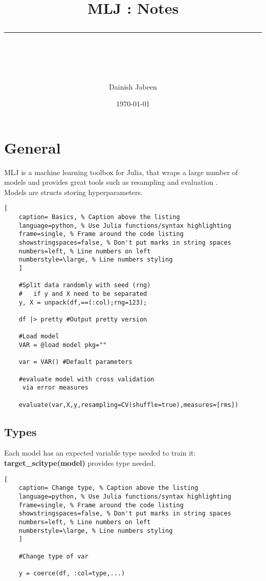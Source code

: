 \documentclass[11pt]{scrartcl} %
\title{	
	\normalfont\normalsize
	\vspace{20pt} %
	{\huge MLJ : Notes}\\ %
	\vspace{12pt} %
	\rule{\linewidth}{2pt}\\ %
}
\author{\small Dainish Jabeen} %
\date{\normalsize\today} %
\begin{document}
\maketitle %

\section{General}

MLJ is a machine learning toolbox for Julia, that wraps a large number of models and provides
great tools such as resampling and evaluation \cite{Blaom2020} \cite{blaom2020flexible}.\\

Models are structs storing hyperparameters.

\begin{lstlisting}[
	caption= Basics, % Caption above the listing
	language=python, % Use Julia functions/syntax highlighting
	frame=single, % Frame around the code listing
	showstringspaces=false, % Don't put marks in string spaces
	numbers=left, % Line numbers on left
	numberstyle=\large, % Line numbers styling
	]

	#Split data randomly with seed (rng) 
	#	if y and X need to be separated
	y, X = unpack(df,==(:col);rng=123); 

	df |> pretty #Output pretty version

	#Load model
	VAR = @load model pkg=""

	var = VAR() #Default parameters

	#evaluate model with cross validation
	 via error measures

	evaluate(var,X,y,resampling=CV(shuffle=true),measures=[rms])
\end{lstlisting}

\subsection{Types}

Each model has an expected variable type needed to train it:\\

\textbf{target\_scitype(model)} provides type needed.\\

\begin{lstlisting}[
	caption= Change type, % Caption above the listing
	language=python, % Use Julia functions/syntax highlighting
	frame=single, % Frame around the code listing
	showstringspaces=false, % Don't put marks in string spaces
	numbers=left, % Line numbers on left
	numberstyle=\large, % Line numbers styling
	]

	#Change type of var

	y = coerce(df, :col=type,...)

\end{lstlisting}
\end{document}
